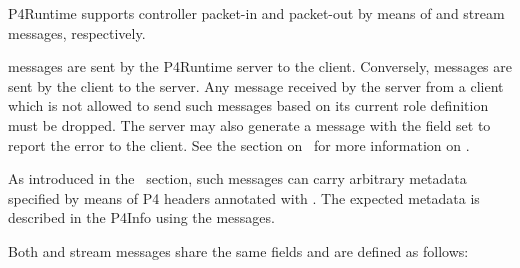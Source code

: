 \documentclass[11pt]{article}
\begin{document}
{%
\noindent{}P4Runtime supports controller packet-in and packet-out by means of 
and  stream messages, respectively.%

 messages are sent by the P4Runtime server to the client. Conversely,
 messages are sent by the client to the server. Any 
message received by the server from a client which is not allowed to send such
messages based on its current role definition must be dropped. The server may
also generate a  message with the  field set to
report the error to the client. See the section on~ for more information on .%

As introduced in the~
section, such messages can carry arbitrary metadata specified by means of P4
headers annotated with . The expected metadata is described
in the P4Info using the  messages.%

Both  and  stream messages share the same fields and are
defined as follows:%

}
\end{document}
